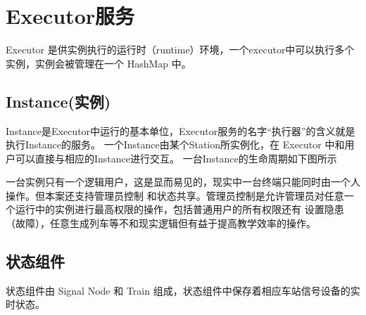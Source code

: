 \section{Executor服务}
Executor 是供实例执行的运行时（runtime）环境，一个executor中可以执行多个实例，实例会被管理在一个
HashMap 中。
\subsection{Instance(实例)}
Instance是Executor中运行的基本单位，Executor服务的名字“执行器”的含义就是执行Instance的服务。
一个Instance由某个Station所实例化，在 Executor 中和用户可以直接与相应的Instance进行交互。
一台Instance的生命周期如下图所示

一台实例只有一个逻辑用户，这是显而易见的，现实中一台终端只能同时由一个人操作。但本案还支持管理员控制
和状态共享。管理员控制是允许管理员对任意一个运行中的实例进行最高权限的操作，包括普通用户的所有权限还有
设置隐患（故障），任意生成列车等不和现实逻辑但有益于提高教学效率的操作。

\subsection{状态组件}
状态组件由 Signal Node 和 Train 组成，状态组件中保存着相应车站信号设备的实时状态。
